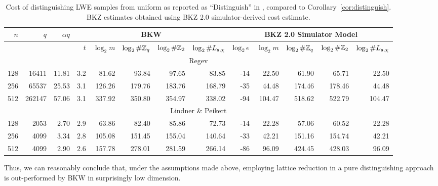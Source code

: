 \begin{table}[!htb]
\begin{center}
\begin{tabular}{|r|r|r||r|r|r|r|r||r|r|r|r|r|} 
\hline
$n$ & $q$ & $\alpha q$ & \multicolumn{5}{|c||}{BKW} &  \multicolumn{5}{|c|}{BKZ 2.0 Simulator Model}\\
\hline
\multicolumn{3}{|c||}{ }  &   $t$   & $\log_2 m$ & $\log_2 \#\mathbb{Z}_q$ & $\log_2 \#\mathbb{Z}_2$ & $\log_2 \#L_{\mathbf{s},\chi}$ & $\log_2 \epsilon$ & $\log_2 m$ & $\log_2 \#\mathbb{Z}_q$ & $\log_2 \#\mathbb{Z}_2$ & $\log_2 \#L_{\mathbf{s},\chi}$\\
\hline
\multicolumn{13}{|c|}{Regev \cite{regev:acm09}}\\
\hline
128 &  16411 & 11.81 & 3.2 &  81.62 &  93.84 &  97.65 &  83.85 & -14 &  22.50 &  61.90 &  65.71 &  22.50\\
256 &  65537 & 25.53 & 3.1 & 126.26 & 179.76 & 183.76 & 168.79 & -35 &  44.48 & 174.46 & 178.46 &  44.48\\
512 & 262147 & 57.06 & 3.1 & 337.92 & 350.80 & 354.97 & 338.02 & -94 & 104.47 & 518.62 & 522.79 & 104.47\\
\hline
\multicolumn{13}{|c|}{Lindner \& Peikert \cite{LindnerP10}}\\
\hline
128 &   2053 &  2.70 & 2.9 &  63.86 &  82.40 &  85.86 &  72.73 & -14 &  22.28 &  57.06 &  60.52 & 22.28\\
256 &   4099 &  3.34 & 2.8 & 105.08 & 151.45 & 155.04 & 140.64 & -33 &  42.21 & 151.16 & 154.74 & 42.21\\
512 &   4099 &  2.90 & 2.6 & 157.78 & 278.01 & 281.59 & 266.14 & -86 &  96.09 & 424.45 & 428.03 & 96.09\\
\hline
\end{tabular}
\end{center}
\caption{Cost of distinguishing LWE samples from uniform as reported as ``Distinguish'' in \cite{LindnerP10}, compared to Corollary~\ref{cor:distinguish}. BKZ estimates obtained using BKZ 2.0 simulator-derived cost estimate.}
\label{tab:concrete_Distinguishing_BKZ_2-0}
\end{table}

Thus, we can reasonably conclude that, under the assumptions made above, employing lattice reduction in a pure distinguishing approach is out-performed by BKW in surprisingly low dimension.


